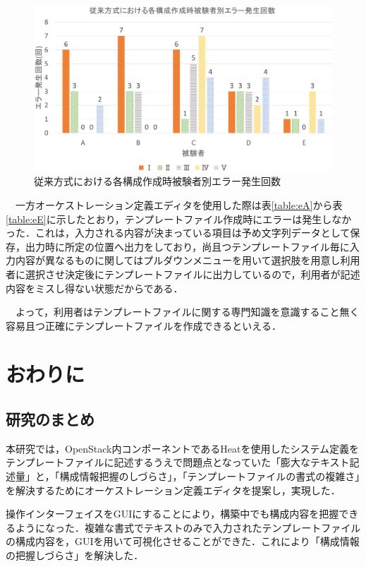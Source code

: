 \documentclass[mingoth]{kut-paper}		%
\begin{document}
		\begin{figure}[H]
			\begin{center}
				\includegraphics[scale=0.45]{Document/TemplateFile_ErrorGraf.eps}
				\caption{従来方式における各構成作成時被験者別エラー発生回数}
				\label{graf:6}
			\end{center}
		\end{figure}
		　一方オーケストレーション定義エディタを使用した際は表\ref{table:eA}から表\ref{table:eE}に示したとおり，テンプレートファイル作成時にエラーは発生しなかった．これは，入力される内容が決まっている項目は予め文字列データとして保存，出力時に所定の位置へ出力をしており，尚且つテンプレートファイル毎に入力内容が異なるものに関してはプルダウンメニューを用いて選択肢を用意し利用者に選択させ決定後にテンプレートファイルに出力しているので，利用者が記述内容をミスし得ない状態だからである．
		
		　よって，利用者はテンプレートファイルに関する専門知識を意識すること無く容易且つ正確にテンプレートファイルを作成できるといえる．
\chapter{おわりに}
	\section{研究のまとめ}
	本研究では，OpenStack内コンポーネントであるHeatを使用したシステム定義をテンプレートファイルに記述するうえで問題点となっていた「膨大なテキスト記述量」と，「構成情報把握のしづらさ」，「テンプレートファイルの書式の複雑さ」を解決するためにオーケストレーション定義エディタを提案し，実現した．
	
	操作インターフェイスをGUIにすることにより，構築中でも構成内容を把握できるようになった．複雑な書式でテキストのみで入力されたテンプレートファイルの構成内容を，GUIを用いて可視化させることができた．これにより「構成情報の把握しづらさ」を解決した．
	
\end{document}
